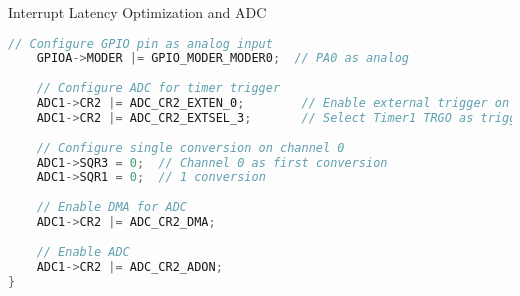 \begin{example2}{Interrupt Latency Optimization and ADC}
\begin{lstlisting}[language=C, style=basesmol]
    // Configure GPIO pin as analog input
    GPIOA->MODER |= GPIO_MODER_MODER0;  // PA0 as analog
    
    // Configure ADC for timer trigger
    ADC1->CR2 |= ADC_CR2_EXTEN_0;        // Enable external trigger on rising edge
    ADC1->CR2 |= ADC_CR2_EXTSEL_3;       // Select Timer1 TRGO as trigger
    
    // Configure single conversion on channel 0
    ADC1->SQR3 = 0;  // Channel 0 as first conversion
    ADC1->SQR1 = 0;  // 1 conversion
    
    // Enable DMA for ADC
    ADC1->CR2 |= ADC_CR2_DMA;
    
    // Enable ADC
    ADC1->CR2 |= ADC_CR2_ADON;
}

\end{lstlisting}
\end{example2}

